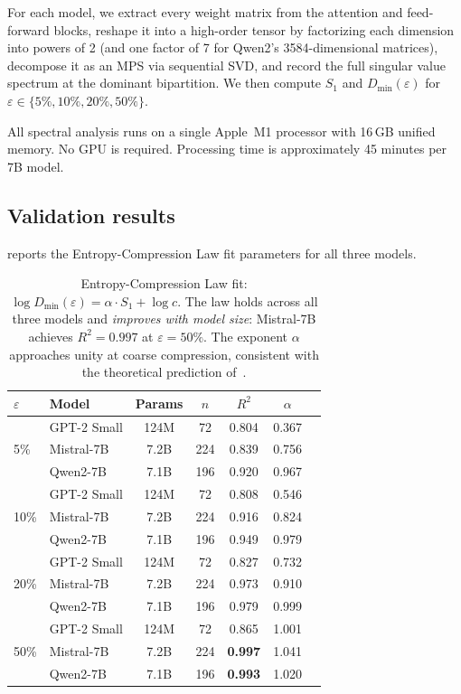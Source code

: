 \documentclass[11pt,a4paper]{article}
\newcommand{\Dmin}{D_{\min}}
\newcommand{\Svn}{S_1}
\begin{document}
For each model, we extract every weight matrix from the attention and
feed-forward blocks, reshape it into a high-order tensor by
factorizing each dimension into powers of 2 (and one factor of 7 for
Qwen2's 3584-dimensional matrices), decompose it as an MPS via
sequential SVD, and record the full singular value spectrum at the
dominant bipartition.  We then compute $\Svn$ and $\Dmin(\varepsilon)$
for $\varepsilon \in \{5\%, 10\%, 20\%, 50\%\}$.

All spectral analysis runs on a single Apple~M1 processor with
16\,GB unified memory.  No GPU is required.  Processing time is
approximately 45 minutes per 7B model.

\subsection{Validation results}
\label{sec:scale-results}

 reports the Entropy-Compression Law fit
parameters for all three models.

\begin{table}[htbp]
\centering
\caption{Entropy-Compression Law fit:
  $\log \Dmin(\varepsilon) = \alpha \cdot \Svn + \log c$.
  The law holds across all three models and \emph{improves with
  model size}: Mistral-7B achieves $R^2 = 0.997$ at
  $\varepsilon = 50\%$.  The exponent $\alpha$ approaches unity
  at coarse compression, consistent with the theoretical prediction
  of~\citet{calderon2026theory}.}
\label{tab:cross-model}
\begin{tabular}{@{}llccccc@{}}
\toprule
$\varepsilon$ & Model & Params & $n$ & $R^2$ & $\alpha$ \\
\midrule
\multirow{3}{*}{5\%}
  & GPT-2 Small  & 124M & 72  & 0.804 & 0.367 \\
  & Mistral-7B   & 7.2B & 224 & 0.839 & 0.756 \\
  & Qwen2-7B     & 7.1B & 196 & 0.920 & 0.967 \\
\midrule
\multirow{3}{*}{10\%}
  & GPT-2 Small  & 124M & 72  & 0.808 & 0.546 \\
  & Mistral-7B   & 7.2B & 224 & 0.916 & 0.824 \\
  & Qwen2-7B     & 7.1B & 196 & 0.949 & 0.979 \\
\midrule
\multirow{3}{*}{20\%}
  & GPT-2 Small  & 124M & 72  & 0.827 & 0.732 \\
  & Mistral-7B   & 7.2B & 224 & 0.973 & 0.910 \\
  & Qwen2-7B     & 7.1B & 196 & 0.979 & 0.999 \\
\midrule
\multirow{3}{*}{50\%}
  & GPT-2 Small  & 124M & 72  & 0.865 & 1.001 \\
  & Mistral-7B   & 7.2B & 224 & \textbf{0.997} & 1.041 \\
  & Qwen2-7B     & 7.1B & 196 & \textbf{0.993} & 1.020 \\
\bottomrule
\end{tabular}
\end{table}
\end{document}
